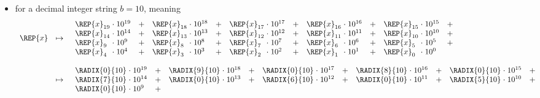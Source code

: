 \begin{itemize}
\item for a     decimal integer string $b=10$, meaning
      \[
      \begin{array}{lcl}
      \REP{x} &\mapsto& \begin{array}{*{5}{l@{\;}c@{\;}lc}}
                        \REP{x}_{19}  &\cdot& 10^{19} &+&
                        \REP{x}_{18}  &\cdot& 10^{18} &+&
                        \REP{x}_{17}  &\cdot& 10^{17} &+&
                        \REP{x}_{16}  &\cdot& 10^{16} &+&
                        \REP{x}_{15}  &\cdot& 10^{15} &+\\
                        \REP{x}_{14}  &\cdot& 10^{14} &+&
                        \REP{x}_{13}  &\cdot& 10^{13} &+&
                        \REP{x}_{12}  &\cdot& 10^{12} &+&
                        \REP{x}_{11}  &\cdot& 10^{11} &+&
                        \REP{x}_{10}  &\cdot& 10^{10} &+\\
                        \REP{x}_{ 9}  &\cdot& 10^{ 9} &+&
                        \REP{x}_{ 8}  &\cdot& 10^{ 8} &+&
                        \REP{x}_{ 7}  &\cdot& 10^{ 7} &+&
                        \REP{x}_{ 6}  &\cdot& 10^{ 6} &+&
                        \REP{x}_{ 5}  &\cdot& 10^{ 5} &+\\
                        \REP{x}_{ 4}  &\cdot& 10^{ 4} &+&
                        \REP{x}_{ 3}  &\cdot& 10^{ 3} &+&
                        \REP{x}_{ 2}  &\cdot& 10^{ 2} &+&
                        \REP{x}_{ 1}  &\cdot& 10^{ 1} &+&
                        \REP{x}_{ 0}  &\cdot& 10^{ 0} & \\
                        \end{array}                     \\\\
              &\mapsto& \begin{array}{*{5}{l@{\;}c@{\;}lc}}
                        \RADIX{0}{10} &\cdot& 10^{19} &+&
                        \RADIX{9}{10} &\cdot& 10^{18} &+&
                        \RADIX{0}{10} &\cdot& 10^{17} &+&
                        \RADIX{8}{10} &\cdot& 10^{16} &+&
                        \RADIX{0}{10} &\cdot& 10^{15} &+\\
                        \RADIX{7}{10} &\cdot& 10^{14} &+&
                        \RADIX{0}{10} &\cdot& 10^{13} &+&
                        \RADIX{6}{10} &\cdot& 10^{12} &+&
                        \RADIX{0}{10} &\cdot& 10^{11} &+&
                        \RADIX{5}{10} &\cdot& 10^{10} &+\\
                        \RADIX{0}{10} &\cdot& 10^{ 9} &+&

\end{array}
\end{array}\]
\end{itemize}

